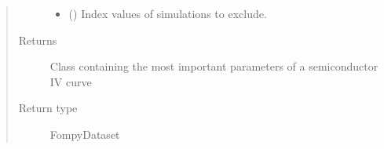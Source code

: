 \documentclass[letterpaper,10pt,english,openany, oneside]{sphinxmanual}
\begin{document}
\begin{fulllineitems}
\begin{quote}
\begin{description}
\begin{itemize}
\item {} 
 () \textendash{} Index values of simulations to exclude.

\end{itemize}

\item[{Returns}] \leavevmode
Class containing the most important parameters of a semiconductor IV curve

\item[{Return type}] \leavevmode
FompyDataset

\end{description}\end{quote}

\end{fulllineitems}

\end{document}
